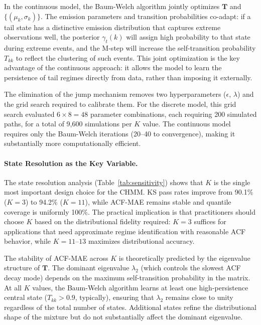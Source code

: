 In the continuous model, the Baum-Welch algorithm jointly optimizes $\mathbf{T}$ and $\{(\mu_k, \sigma_k)\}$.
The emission parameters and transition probabilities co-adapt: if a tail state has a distinctive emission distribution that captures extreme observations well, the posterior $\gamma_t(k)$ will assign high probability to that state during extreme events, and the M-step will increase the self-transition probability $T_{kk}$ to reflect the clustering of such events.
This joint optimization is the key advantage of the continuous approach: it allows the model to learn the persistence of tail regimes directly from data, rather than imposing it externally.

The elimination of the jump mechanism removes two hyperparameters ($\epsilon$, $\lambda$) and the grid search required to calibrate them.
For the discrete model, this grid search evaluated $6 \times 8 = 48$ parameter combinations, each requiring 200 simulated paths, for a total of 9{,}600 simulations per $K$ value.
The continuous model requires only the Baum-Welch iterations (20--40 to convergence), making it substantially more computationally efficient.

\paragraph{State Resolution as the Key Variable.}
The state resolution analysis (Table~\ref{tab:sensitivity}) shows that $K$ is the single most important design choice for the CHMM.
KS pass rates improve from 90.1\% ($K = 3$) to 94.2\% ($K = 11$), while ACF-MAE remains stable and quantile coverage is uniformly 100\%.
The practical implication is that practitioners should choose $K$ based on the distributional fidelity required: $K = 3$ suffices for applications that need approximate regime identification with reasonable ACF behavior, while $K = 11$--$13$ maximizes distributional accuracy.

The stability of ACF-MAE across $K$ is theoretically predicted by the eigenvalue structure of $\mathbf{T}$.
The dominant eigenvalue $\lambda_2$ (which controls the slowest ACF decay mode) depends on the maximum self-transition probability in the matrix.
At all $K$ values, the Baum-Welch algorithm learns at least one high-persistence central state ($T_{kk} > 0.9$, typically), ensuring that $\lambda_2$ remains close to unity regardless of the total number of states.
Additional states refine the distributional shape of the mixture but do not substantially affect the dominant eigenvalue.

